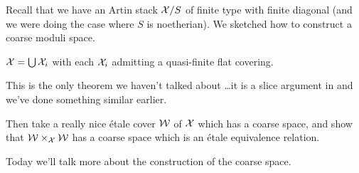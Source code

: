 

Recall that we have an Artin stack $\mathcal{X}/S$ of finite type with finite
diagonal (and we were doing the case where $S$ is noetherian). We
sketched how to construct a coarse moduli space.

\begin{theorem}[C]
  $\mathcal{X}=\bigcup \mathcal{X}_i$ with each $\mathcal{X}_i$ admitting a quasi-finite flat
covering.
\end{theorem}
This is the only theorem we haven't talked about \dots it is a slice
argument in \cite[3]{SGA} and we've done something similar earlier.

Then take a really nice \'etale cover $\mathcal{W}$ of $\mathcal{X}$ which has a coarse
space, and show that $\mathcal{W}\times_{\mathcal{X}} \mathcal{W}$ has a coarse space which is an
\'etale equivalence relation.

Today we'll talk more about the construction of the coarse space.

